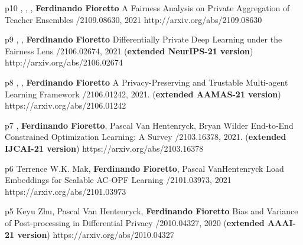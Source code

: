 \begin{pubs}
\wsentry 
	{p10}%
	{, , , {\bf Ferdinando Fioretto}}
	{A Fairness Analysis on Private Aggregation of Teacher Ensembles}
	{/2109.08630, 2021}
	{http://arxiv.org/abs/2109.08630}

\wsentry %
	{p9}%
	{, , {\bf Ferdinando Fioretto}}
	{Differentially Private Deep Learning under the Fairness Lens}
	{/2106.02674, 2021 ({\bf extended NeurIPS-21 version})}
	{http://arxiv.org/abs/2106.02674}


\wsentry 
	{p8}%
	{, , {\bf Ferdinando Fioretto}}
	{A Privacy-Preserving and Trustable Multi-agent Learning Framework}
	{/2106.01242, 2021. ({\bf extended AAMAS-21 version})}
	{https://arxiv.org/abs/2106.01242}


\wsentry %
	{p7}%
	{, {\bf Ferdinando Fioretto}, Pascal Van Hentenryck, Bryan Wilder}
	{End-to-End Constrained Optimization Learning: A Survey}
	{/2103.16378, 2021. ({\bf extended IJCAI-21 version})}
	{https://arxiv.org/abs/2103.16378}

\wsentry 
	{p6}%
	{Terrence W.K. Mak, {\bf Ferdinando Fioretto}, Pascal VanHentenryck}
	{Load Embeddings for Scalable AC-OPF Learning}
	{/2101.03973, 2021}
	{https://arxiv.org/abs/2101.03973}

\wsentry 
	{p5}%
	{Keyu Zhu, Pascal Van Hentenryck, {\bf Ferdinando Fioretto}}
	{Bias and Variance of Post-processing in Differential Privacy}
	{/2010.04327, 2020 ({\bf extended AAAI-21 version})}
	{https://arxiv.org/abs/2010.04327}



\end{pubs}

